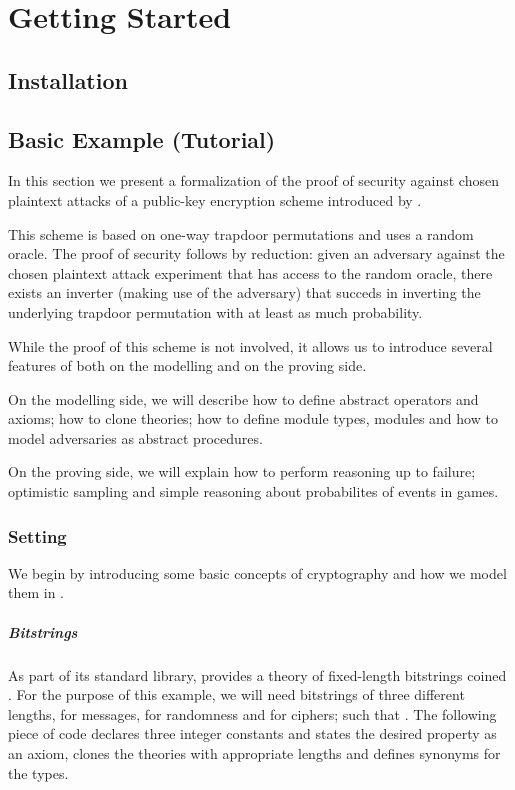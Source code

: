 
\chapter{Getting Started}
\section{Installation}

\section{Basic Example (Tutorial)}
In this section we present a formalization of the proof of security
against chosen plaintext attacks of a public-key encryption scheme
introduced by \citet{br93}.

This scheme is based on one-way trapdoor permutations and uses a
random oracle. The proof of security follows by reduction: given an
adversary against the chosen plaintext attack experiment that has
access to the random oracle, there exists an inverter (making use of
the adversary) that succeds in inverting the underlying trapdoor
permutation with at least as much probability.

While the proof of this scheme is not involved, it allows us to
introduce several features of \EC both on the modelling and on
the proving side.

On the modelling side, we will describe how to define abstract operators
and axioms; how to clone theories; how to define module types, modules
and how to model adversaries as abstract procedures.

On the proving side, we will explain how to perform reasoning up to
failure; optimistic sampling and simple reasoning about probabilites
of events in games.

\subsection{Setting}
We begin by introducing some basic concepts of cryptography and how we
model them in \EC.

\paragraph{Bitstrings}
As part of its standard library, \EC provides a theory of fixed-length
bitstrings coined . For the purpose of this example, we will
need bitstrings of three different lengths,  for messages, 
for randomness and  for ciphers; such that . The
following piece of code declares three integer constants and states
the desired property as an axiom, clones the theories with appropriate
lengths and defines synonyms for the types.

